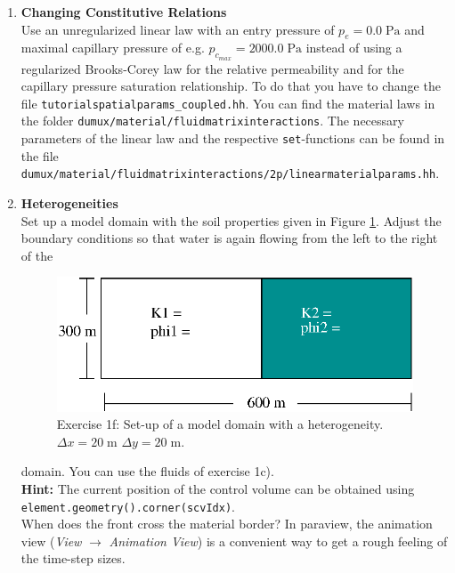 \begin{enumerate}
\item \textbf{Changing Constitutive Relations} \\
  Use an unregularized linear law with an entry pressure of $p_e = 0.0\;\text{Pa}$ and maximal capillary pressure of e.g. $p_{c_{max}} = 2000.0\;\text{Pa}$ instead of using a
 regularized Brooks-Corey law for the
  relative permeability and for the capillary pressure saturation relationship. To do that you have
  to change the file \texttt{tutorialspatialparams\_coupled.hh}. 
 You can find the material laws in the folder 
  \verb+dumux/material/fluidmatrixinteractions+. The necessary parameters
of the linear law and the respective \texttt{set}-functions can be found
 in the file \\
 \verb+dumux/material/fluidmatrixinteractions/2p/linearmaterialparams.hh+.
 
\item \textbf{Heterogeneities}  \\
  Set up a model domain with the soil properties given in Figure
  \ref{tutorial-coupled:exercise1_d}. Adjust the boundary conditions
  so that water is again flowing from the left to the right of the
\begin{figure}[ht]
\centering
\includegraphics[width=0.5\linewidth,keepaspectratio]{EPS/exercise1_c.eps}
\caption{Exercise 1f: Set-up of a model domain with a heterogeneity. $\Delta x = 20 \;\text{m}$ $\Delta y = 20\;\text{m}$.}\label{tutorial-coupled:exercise1_d}
\end{figure}
domain. You can use the fluids of exercise 1c).\\
\textbf{Hint:} The current position of the control volume can be obtained using \texttt{element\allowbreak.geometry()\allowbreak.corner(scvIdx)}.\\
When does the front cross the material border? In paraview, the
animation view (\textit{View} $\rightarrow$ \textit{Animation
  View}) is a convenient way to get a rough feeling of the time-step
sizes.
\end{enumerate}

